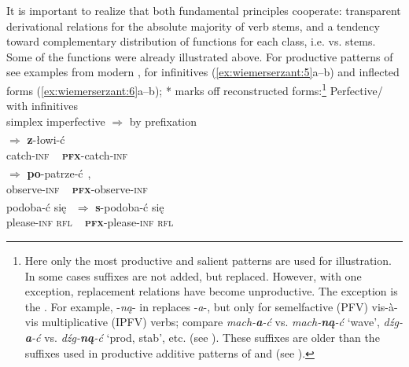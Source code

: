 \documentclass[output=paper]{langsci/langscibook}
\begin{document}
It is important to realize that both fundamental principles cooperate: transparent derivational relations for the absolute majority of verb stems, and a tendency toward complementary distribution of functions for each class, i.e.  vs.  stems. Some of the functions were already illustrated above. For productive patterns of  see examples from modern , for infinitives (\ref{ex:wiemerserzant:5}a–b) and inflected forms (\ref{ex:wiemerserzant:6}a–b); * marks off reconstructed forms:\footnote{Here only the most productive and salient patterns are used for illustration. In some cases suffixes are not added, but replaced. However, with one exception, replacement relations have become unproductive. The exception is the . For example, -\textit{ną}- in  replaces -\textit{a}-, but only for semelfactive (PFV) vis-à-vis multiplicative (IPFV) verbs; compare \textit{mach-\textbf{{a}}-ć} vs. \textit{mach-\textbf{{ną}}-ć} ‘wave’, \textit{dźg-\textbf{{a}}-ć} vs. \textit{dźg-\textbf{{ną}}-ć} ‘prod, stab’, etc. (see ). These suffixes are older than the suffixes used in productive additive patterns of  and  (see ).\label{fn:wiemer:7}}
\ea
    \label{ex:wiemerserzant:5}
    Perfective/  with infinitives\\
\ea
 {simplex imperfective} ${\Rightarrow}$ { by prefixation}\\
 ${\Rightarrow}$   \textbf{{z}}{-łowi-ć}{\textsuperscript{~}\PFV}\\
catch-\textsc{inf} ~ \textsc{\textbf{pfx}}\textsc{-}catch-\textsc{inf}\\

 ${\Rightarrow}$   \textbf{{po}}{-patrze-ć}{\textsuperscript{~}\PFV},\\
observe-\textsc{inf}  ~    \textbf{\textsc{pfx}}-observe-\textsc{inf} \\

\gll podoba-ć   się{\textsuperscript{~}\IPFV}  ${\Rightarrow}$  \textbf{{s}}{-podoba-ć      się}{\textsuperscript{~}\PFV}\\
please-\textsc{inf}  \textsc{rfl}   ~   \textbf{\textsc{pfx}}-please-\textsc{inf }  \textsc{   rfl}\\
\end{document}
